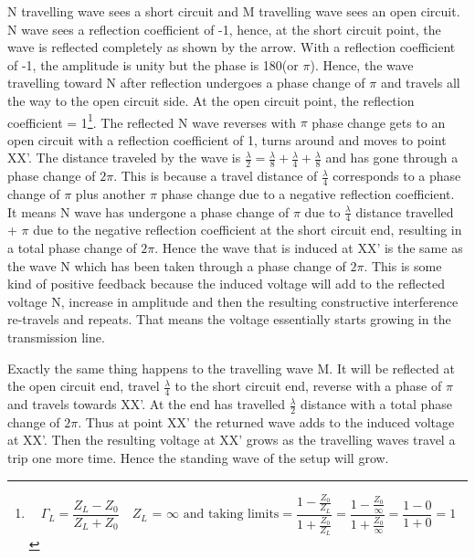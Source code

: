 N travelling wave sees a short circuit and M travelling wave sees an open circuit. N wave sees a reflection coefficient of -1, hence, at the short circuit point, the wave is reflected completely as shown by the arrow. With a reflection coefficient of -1, the amplitude is unity but the phase is 180\textdegree (or $\pi$). Hence, the wave travelling toward N after reflection undergoes a phase change of $\pi$ and travels all the way to the open circuit side. At the open circuit point, the reflection coefficient = 1\footnote{
\begin{dmath}
\Gamma_{L} = \frac{Z_{L} - Z_0}{Z_{L} + Z_0}\quad Z_{L}\text{ = }\infty\text{ and taking limits}
= \frac{1 - \frac{Z_0}{Z_{L}}}{1 + \frac{Z_0}{Z_{L}}}
= \frac{1 - \frac{Z_0}\infty}{1 + \frac{Z_0}\infty}
= \frac{1 - 0}{1 + 0}
= 1
\end{dmath}
}. The reflected N wave reverses with $\pi$ phase change gets to an open circuit with a reflection coefficient of 1, turns around and moves to point XX'. The distance traveled by the wave is $ \frac{\lambda}{2} = \frac{\lambda}{8} + \frac{\lambda}{4} + \frac{\lambda}{8}$ and has gone through a phase change of $2\pi$. This is because a travel distance of $\frac{\lambda}{4}$ corresponds to a phase change of $\pi$ plus another $\pi$ phase change due to a negative reflection coefficient. It means N wave has undergone a phase change of $\pi$ due to $\frac{\lambda }{4}$ distance travelled + $\pi$ due to the negative reflection coefficient at the short circuit end, resulting in a total phase change of $2\pi$. Hence the wave that is induced at XX' is the same as the wave N which has been taken through a phase change of $2\pi$. This is some kind of positive feedback because the induced voltage will add to the reflected voltage N, increase in amplitude and then the resulting constructive interference re-travels and repeats. That means the voltage essentially starts growing in the transmission line.

Exactly the same thing happens to the travelling wave M. It will be reflected at the open circuit end, travel $\frac{\lambda}{4}$ to the short circuit end, reverse with a phase of $\pi$ and travels towards XX'. At the end has travelled $\frac{\lambda }{2}$ distance with a total phase change of $2\pi$. Thus at point XX' the returned wave adds to the induced voltage at XX'. Then the resulting voltage at XX' grows as the travelling waves travel a trip one more time. Hence the standing wave of the setup will grow.

